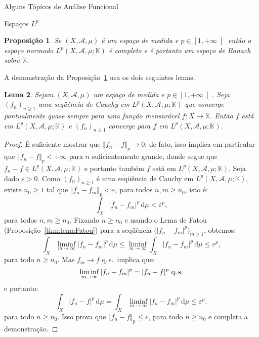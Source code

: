\documentclass[oneside,final,11pt]{amsbook}
\newcommand{\K}{\mathds K}
\newcommand{\dd}{\mathrm d}
\newcommand{\qs}{\hbox{q.$\,$s.}}
\theoremstyle{remark}\newtheorem{exercise}{Exercício}[chapter]
\theoremstyle{remark}\newtheorem{*exercise}[exercise]{\hbox to 0pt{\hskip 0pt minus 1fil*}Exercício}
\theoremstyle{definition}\newtheorem{exdefin}{Definição}[chapter]
\theoremstyle{plain}\newtheorem{teo}{Teorema}[section]
\theoremstyle{plain}\newtheorem{lem}[teo]{Lema}
\theoremstyle{plain}\newtheorem{prop}[teo]{Proposição}
\theoremstyle{plain}\newtheorem{cor}[teo]{Corolário}
\theoremstyle{definition}\newtheorem{defin}[teo]{Definição}
\theoremstyle{remark}\newtheorem{rem}[teo]{Observação}
\theoremstyle{definition}\newtheorem{notation}[teo]{Notação}
\theoremstyle{definition}\newtheorem{convention}[teo]{Convenção}
\theoremstyle{definition}\newtheorem{example}[teo]{Exemplo}
\numberwithin{section}{chapter}
\numberwithin{equation}{section}
\begin{document}
\begin{chapter}{Alguns Tópicos de Análise Funcional}
\begin{section}[Espaços $L^p$]{Espaços ${L^p}$}
\begin{prop}\label{thm:Lpcompleto}
Se $(X,\mathcal A,\mu)$ é um espaço de medida e $p\in\left[1,+\infty\right[$ então o espaço normado $L^p(X,\mathcal A,\mu;\K)$ é completo
e é portanto um espaço de Banach sobre $\K$.
\end{prop}

A demonstração da Proposição~\ref{thm:Lpcompleto} usa os dois seguintes lemas.
\begin{lem}\label{thm:limiteqsemLp}
Sejam $(X,\mathcal A,\mu)$ um espaço de medida e $p\in\left[1,+\infty\right[$.
Seja $(f_n)_{n\ge1}$ uma seqüência de Cauchy em
$L^p(X,\mathcal A,\mu;\K)$ que converge pontualmente quase sempre para uma função mensurável $f:X\to\K$.
Então $f$ está em $L^p(X,\mathcal A,\mu;\K)$ e $(f_n)_{n\ge1}$ converge para $f$ em $L^p(X,\mathcal A,\mu;\K)$.
\end{lem}
\begin{proof}
É suficiente mostrar que $\Vert f_n-f\Vert_p\to0$; de fato, isso implica em particular que $\Vert f_n-f\Vert_p<+\infty$
para $n$ suficientemente grande, donde segue que $f_n-f\in L^p(X,\mathcal A,\mu;\K)$ e portanto também
$f$ está em $L^p(X,\mathcal A,\mu;\K)$. Seja dado $\varepsilon>0$. Como $(f_n)_{n\ge1}$ é uma seqüência de Cauchy em
$L^p(X,\mathcal A,\mu;\K)$, existe $n_0\ge1$ tal que $\Vert f_n-f_m\Vert_p<\varepsilon$, para todos $n,m\ge n_0$, isto é:
\[\int_X\vert f_n-f_m\vert^p\,\dd\mu<\varepsilon^p,\]
para todos $n,m\ge n_0$. Fixando $n\ge n_0$ e usando o Lema de Fatou (Proposição~\ref{thm:lemaFatou}) para a seqüência
$\big(\vert f_n-f_m\vert^p\big)_{m\ge1}$, obtemos:
\[\int_X\liminf_{m\to\infty}\vert f_n-f_m\vert^p\,\dd\mu\le\liminf_{m\to\infty}\int_X\vert f_n-f_m\vert^p\,\dd\mu\le
\varepsilon^p,\]
para todo $n\ge n_0$. Mas $f_m\to f$ \qs\ implica que:
\[\liminf_{m\to\infty}\vert f_n-f_m\vert^p=\vert f_n-f\vert^p\ \qs\]
e portanto:
\[\int_X\vert f_n-f\vert^p\,\dd\mu=\int_X\liminf_{m\to\infty}\vert f_n-f_m\vert^p\,\dd\mu\le\varepsilon^p,\]
para todo $n\ge n_0$. Isso prova que $\Vert f_n-f\Vert_p\le\varepsilon$, para todo $n\ge n_0$ e completa a demonstração.
\end{proof}


\end{section}
\end{chapter}
\end{document}
